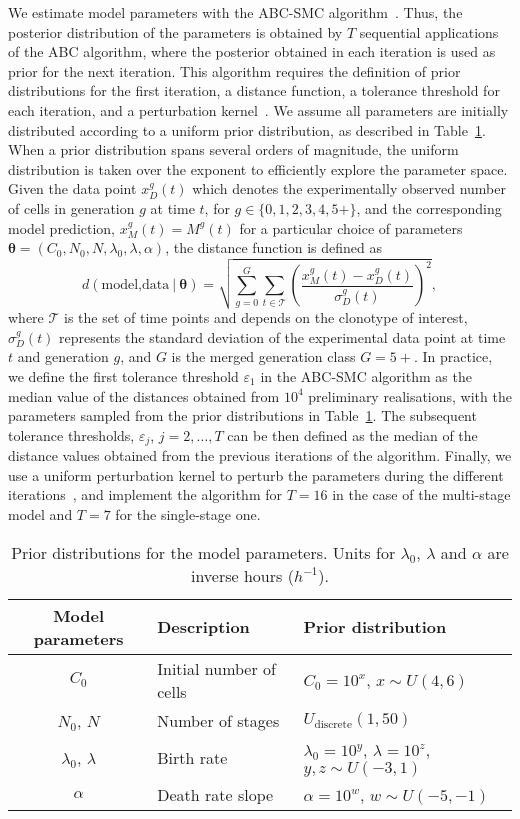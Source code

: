 \documentclass[10pt]{article}
\numberwithin{equation}{section}
\begin{document}
We estimate model parameters with the ABC-SMC algorithm~\cite{toni}. Thus, the posterior distribution of the parameters is obtained by $T$ sequential applications of the ABC algorithm, where the posterior obtained in each iteration is used as prior for the next iteration. This algorithm requires the definition of prior distributions for the first iteration, a distance function,
a tolerance threshold for each iteration, and a perturbation kernel~\cite{toni}. 
We assume all parameters are initially distributed according to a uniform
prior distribution,
 as described in Table~\ref{priors}. When a prior distribution spans several orders of magnitude, the uniform distribution is taken over the exponent to efficiently explore the parameter space. Given the data point $x_D^g(t)$ which denotes the experimentally observed number of cells in generation $g$ at time $t$, for $g\in\{0,1,2,3,4,5+\}$, and the corresponding model prediction, $x^{g}_M(t)=M^g(t)$ for a particular choice of parameters ${\boldsymbol \theta}=(C_0,N_0,N,\lambda_0,\lambda,\alpha)$, the distance function is defined as \begin{equation}
    \label{distance}
        d(\text{model,data} \ | \ {\boldsymbol \theta}) = \sqrt{\sum_{g=0}^{G} \sum_{t \in \mathscr{T}} \left( \frac{x^{g}_M(t) - x_D^g(t)}{\sigma_D^g(t)} \right)^2},
\end{equation}
where $\mathscr{T}$ is the set of time points and depends on the clonotype of interest, $\sigma_D^g(t)$ represents the standard deviation of the experimental data point at time $t$ and generation $g$, and $G$ is the  merged generation class $G=5+$. In practice, we define the first tolerance threshold $\varepsilon_1$ in the ABC-SMC algorithm as the median value of the distances obtained from $10^4$ preliminary realisations, with the parameters sampled from the prior distributions in Table~\ref{priors}. The subsequent tolerance thresholds, $\varepsilon_j$, $j=2,\ldots,T$ can be then defined as the median of the distance values obtained from the previous iterations of the algorithm. Finally, we use a uniform perturbation kernel to perturb the parameters during the different iterations~\cite{toni}, and implement the algorithm for $T= 16$ in the case of the multi-stage model and $T=7$ for the single-stage one.

\begin{table}[h!]
    \centering
    \begin{tabular}{|c| l| l|}
    \hline
    Model parameters & Description & Prior distribution \\
    \hline
    $C_0$ & Initial number of cells & $C_0=10^x$, $x\sim U(4,6)$ \\
    $N_0$, $N$ & Number of stages & $U_{\text{discrete}}(1,50)$ \\
    $\lambda_0$, $\lambda$ & Birth rate & $\lambda_0=10^y$, $\lambda=10^z$, $y,z\sim U(-3,1)$  \\
    $\alpha$ & Death rate slope & $\alpha=10^w$, $w\sim U(-5,-1)$\\
    \hline
    \end{tabular}
\caption{Prior distributions for the model parameters.
Units for  $\lambda_0$, $\lambda$ and $\alpha$ are inverse hours ($h^{-1}$).}
\label{priors}
\end{table}
\end{document}
